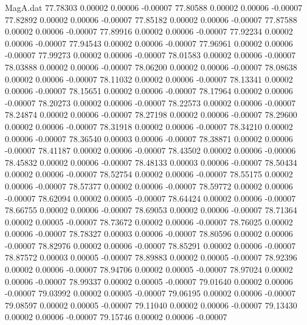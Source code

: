 \begin{filecontents}{MagA.dat}
  77.78303    0.00002    0.00006   -0.00007
  77.80588    0.00002    0.00006   -0.00007
  77.82892    0.00002    0.00006   -0.00007
  77.85182    0.00002    0.00006   -0.00007
  77.87588    0.00002    0.00006   -0.00007
  77.89916    0.00002    0.00006   -0.00007
  77.92234    0.00002    0.00006   -0.00007
  77.94543    0.00002    0.00006   -0.00007
  77.96961    0.00002    0.00006   -0.00007
  77.99273    0.00002    0.00006   -0.00007
  78.01583    0.00002    0.00006   -0.00007
  78.03888    0.00002    0.00006   -0.00007
  78.06200    0.00002    0.00006   -0.00007
  78.08638    0.00002    0.00006   -0.00007
  78.11032    0.00002    0.00006   -0.00007
  78.13341    0.00002    0.00006   -0.00007
  78.15651    0.00002    0.00006   -0.00007
  78.17964    0.00002    0.00006   -0.00007
  78.20273    0.00002    0.00006   -0.00007
  78.22573    0.00002    0.00006   -0.00007
  78.24874    0.00002    0.00006   -0.00007
  78.27198    0.00002    0.00006   -0.00007
  78.29600    0.00002    0.00006   -0.00007
  78.31918    0.00002    0.00006   -0.00007
  78.34210    0.00002    0.00006   -0.00007
  78.36540    0.00003    0.00006   -0.00007
  78.38871    0.00002    0.00006   -0.00007
  78.41187    0.00002    0.00006   -0.00007
  78.43502    0.00002    0.00006   -0.00006
  78.45832    0.00002    0.00006   -0.00007
  78.48133    0.00003    0.00006   -0.00007
  78.50434    0.00002    0.00006   -0.00007
  78.52754    0.00002    0.00006   -0.00007
  78.55175    0.00002    0.00006   -0.00007
  78.57377    0.00002    0.00006   -0.00007
  78.59772    0.00002    0.00006   -0.00007
  78.62094    0.00002    0.00005   -0.00007
  78.64424    0.00002    0.00006   -0.00007
  78.66755    0.00002    0.00006   -0.00007
  78.69053    0.00002    0.00006   -0.00007
  78.71364    0.00002    0.00005   -0.00007
  78.73672    0.00002    0.00006   -0.00007
  78.76025    0.00002    0.00006   -0.00007
  78.78327    0.00003    0.00006   -0.00007
  78.80596    0.00002    0.00006   -0.00007
  78.82976    0.00002    0.00006   -0.00007
  78.85291    0.00002    0.00006   -0.00007
  78.87572    0.00003    0.00005   -0.00007
  78.89883    0.00002    0.00005   -0.00007
  78.92396    0.00002    0.00006   -0.00007
  78.94706    0.00002    0.00005   -0.00007
  78.97024    0.00002    0.00006   -0.00007
  78.99337    0.00002    0.00005   -0.00007
  79.01640    0.00002    0.00006   -0.00007
  79.03992    0.00002    0.00005   -0.00007
  79.06195    0.00002    0.00006   -0.00007
  79.08597    0.00002    0.00005   -0.00007
  79.11040    0.00002    0.00006   -0.00007
  79.13430    0.00002    0.00006   -0.00007
  79.15746    0.00002    0.00006   -0.00007

\end{filecontents}
